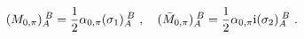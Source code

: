\begin{equation}
	 (M_{0,\pi})_A^{\;B}=\frac{1}{2}\alpha_{0,\pi}(\sigma_1)_A^{\;B}\ ,\quad (\bar{M}_{0,\pi})_A^{\;B}=\frac{1}{2}\alpha_{0,\pi}{\rm i}
(\sigma_2)_A^{\;B}\ .
       \end{equation}

